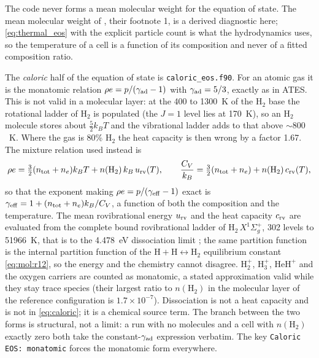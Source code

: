 The code never forms a mean molecular weight for the equation of state.  The
mean molecular weight of \citet{Caldiroli2021}, their footnote 1, is a derived
diagnostic here; \eqref{eq:thermal_eos} with the explicit particle count is
what the hydrodynamics uses, so the temperature of a cell is a function of its
composition and never of a fitted composition ratio.

The \emph{caloric} half of the equation of state is \texttt{caloric\_eos.f90}.
For an atomic gas it is the monatomic relation
$\rho e = p/(\gamma_{\rm ad}-1)$ with $\gamma_{\rm ad} = 5/3$, exactly as in
ATES.  This is not valid in a molecular layer: at the 400 to 1300~K of the
$\mathrm{H}_2$ base the rotational ladder of $\mathrm{H}_2$ is populated (the
$J=1$ level lies at 170~K), so an $\mathrm{H}_2$ molecule stores about
$\tfrac{5}{2}k_BT$ and the vibrational ladder adds to that above $\sim800$~K.
Where the gas is 80\% $\mathrm{H}_2$ the heat capacity is then wrong by a
factor 1.67.  The mixture relation used instead is
%
\begin{equation}
  \rho e = \tfrac{3}{2}(n_{\rm tot}+n_e)k_BT + n(\mathrm{H_2})\,k_B\,u_{\rm rv}(T),
  \qquad
  \frac{C_V}{k_B} = \tfrac{3}{2}(n_{\rm tot}+n_e) + n(\mathrm{H_2})\,c_{\rm rv}(T),
  \label{eq:caloric}
\end{equation}
%
so that the exponent making $\rho e = p/(\gamma_{\rm eff}-1)$ exact is
$\gamma_{\rm eff} = 1 + (n_{\rm tot}+n_e)k_B/C_V$, a function of both the
composition and the temperature.  The mean rovibrational energy $u_{\rm rv}$
and the heat capacity $c_{\rm rv}$ are evaluated from the complete bound
rovibrational ladder of $\mathrm{H}_2\,X^1\Sigma_g^+$, 302 levels to
51966~K, that is to the 4.478~eV dissociation limit
\citep[Table 2 through VizieR]{Roueff2019}; the same partition function is the
internal partition function of the
$\mathrm{H}+\mathrm{H}\leftrightarrow\mathrm{H}_2$ equilibrium constant
\eqref{eq:mol:r12}, so the energy and the chemistry cannot disagree.
$\mathrm{H}_2^+$, $\mathrm{H}_3^+$, $\mathrm{HeH}^+$ and the oxygen carriers
are counted as monatomic, a stated approximation valid while they stay trace
species (their largest ratio to $n(\mathrm{H_2})$ in the molecular layer of
the reference configuration is $1.7\times10^{-7}$).  Dissociation is not a
heat capacity and is not in \eqref{eq:caloric}; it is a chemical source
term.  The branch between the
two forms is structural, not a limit: a run with no molecules and a cell with
$n(\mathrm{H_2})$ exactly zero both take the constant-$\gamma_{\rm ad}$
expression verbatim.  The key \texttt{Caloric EOS: monatomic} forces the
monatomic form everywhere.

